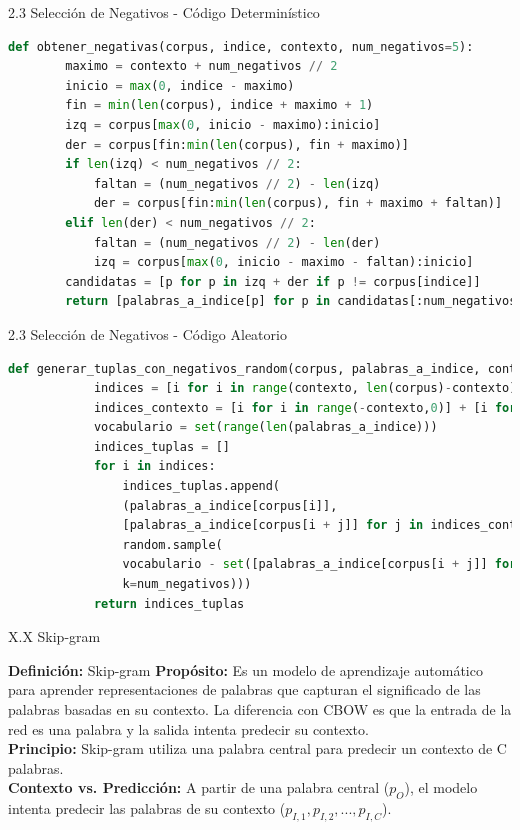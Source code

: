 \documentclass{beamer}
\begin{document}
\begin{frame}[fragile]{2.3 Selección de Negativos - Código Determinístico}
	\begin{block}{}
		\begin{lstlisting}[language=Python]
def obtener_negativas(corpus, indice, contexto, num_negativos=5):
		maximo = contexto + num_negativos // 2
		inicio = max(0, indice - maximo)
		fin = min(len(corpus), indice + maximo + 1)
		izq = corpus[max(0, inicio - maximo):inicio]
		der = corpus[fin:min(len(corpus), fin + maximo)]
		if len(izq) < num_negativos // 2:
			faltan = (num_negativos // 2) - len(izq)
			der = corpus[fin:min(len(corpus), fin + maximo + faltan)]
		elif len(der) < num_negativos // 2:
			faltan = (num_negativos // 2) - len(der)
			izq = corpus[max(0, inicio - maximo - faltan):inicio]
		candidatas = [p for p in izq + der if p != corpus[indice]]
		return [palabras_a_indice[p] for p in candidatas[:num_negativos]]
		\end{lstlisting}
	\end{block}
\end{frame}

\begin{frame}[fragile]{2.3 Selección de Negativos - Código Aleatorio}
	\begin{block}{}
		\begin{lstlisting}[language=Python]
def generar_tuplas_con_negativos_random(corpus, palabras_a_indice, contexto, num_negativos):
			indices = [i for i in range(contexto, len(corpus)-contexto)]
			indices_contexto = [i for i in range(-contexto,0)] + [i for i in range(1,contexto+1)]
			vocabulario = set(range(len(palabras_a_indice)))
			indices_tuplas = []
			for i in indices:
				indices_tuplas.append(
				(palabras_a_indice[corpus[i]],
				[palabras_a_indice[corpus[i + j]] for j in indices_contexto],
				random.sample(
				vocabulario - set([palabras_a_indice[corpus[i + j]] for j in indices_contexto]),
				k=num_negativos)))
			return indices_tuplas
		\end{lstlisting}
	\end{block}
\end{frame}
	
\begin{frame}[fragile]{X.X Skip-gram}
	\begin{block}{\textbf{Definición:} Skip-gram}
		\justifying
		\vspace{0.1cm}
		\textbf{Propósito:} Es un modelo de aprendizaje automático para aprender representaciones de palabras que capturan el significado de las palabras basadas en su contexto. La diferencia con CBOW es que la entrada de la red es una palabra y la salida intenta predecir su contexto.\\
		\vspace{0.1cm}
		\textbf{Principio:} Skip-gram utiliza una palabra central para predecir un contexto de C palabras.\\
		\vspace{0.1cm}
		\textbf{Contexto vs. Predicción:} A partir de una palabra central ($p_O$), el modelo intenta predecir las palabras de su contexto ($p_{I,1}, p_{I,2}, ..., p_{I,C}$).
	\end{block}    
\end{frame}
\end{document}
